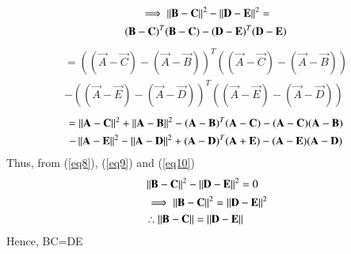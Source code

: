 \documentclass[journal,12pt,twocolumn]{IEEEtran}
\begin{document}
\begin{multline}
\implies \left\lVert\mathbf{B}-\mathbf{C}\right\rVert^2 - \left\lVert\mathbf{D}-\mathbf{E}\right\rVert^2=\\
(\mathbf B -\mathbf C)^T(\mathbf{B}-\mathbf{C})-(\mathbf D -\mathbf E)^T(\mathbf{D}-\mathbf{E})\label{eq11}
\end{multline}
\begin{multline}
=((\vec A -\vec C)-(\vec A -\vec B))^T((\vec A -\vec C)-(\vec A -\vec B))\\-((\vec A -\vec E)-(\vec A -\vec D))^T((\vec A -\vec E)-(\vec A -\vec D))\label{eq12}
\end{multline}
\begin{multline}
=\left\lVert\mathbf{A}-\mathbf{C}\right\rVert^2 + \left\lVert\mathbf{A}-\mathbf{B}\right\rVert^2- (\mathbf A -\mathbf B)^T(\mathbf{A}-\mathbf{C})-(\mathbf{A}-\mathbf{C})(\mathbf{A}-\mathbf{B})\\
-\left\lVert\mathbf{A}-\mathbf{E}\right\rVert^2 - \left\lVert\mathbf{A}-\mathbf{D}\right\rVert^2+ (\mathbf A -\mathbf D)^T(\mathbf{A}+\mathbf{E})-(\mathbf{A}-\mathbf{E})(\mathbf{A}-\mathbf{D})\label{eq13}
\end{multline}
Thus, from (\ref{eq8}), (\ref{eq9}) and (\ref{eq10})
\begin{align}
& \left\lVert\mathbf{B}-\mathbf{C}\right\rVert^2 - \left\lVert\mathbf{D}-\mathbf{E}\right\rVert^2=0\label{eq14}\\ 
& \implies \left\lVert\mathbf{B}-\mathbf{C}\right\rVert^2 = \left\lVert\mathbf{D}-\mathbf{E}\right\rVert^2 \label{eq15}\\
	& \therefore\left\lVert\mathbf{B}-\mathbf{C}\right\rVert = \left\lVert\mathbf{D}-\mathbf{E}\right\rVert\label{eq16}
\end{align}
Hence, BC=DE
\end{document}
